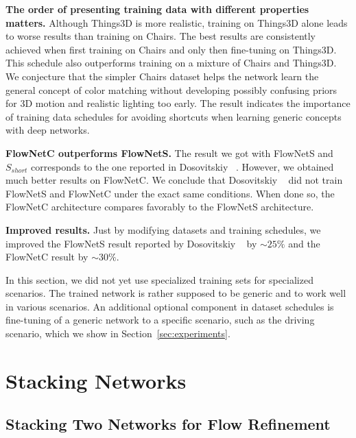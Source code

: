 \documentclass[10pt,twocolumn,letterpaper]{article}%
\newcommand{\chairs}{\mbox{Chairs}\xspace}
\newcommand{\things}{\mbox{Things3D}\xspace}
\newcommand{\FN}[1]{\mbox{FlowNet2-#1}\xspace}
\newcommand{\Sshort}{S_\mathit{short}}
\begin{document}
\textbf{The order of presenting training data with different properties matters.} Although \things is more realistic, training on \things alone leads to worse results than training on \chairs. The best results are consistently achieved when first training on \chairs and only then fine-tuning on \things. This schedule also outperforms training on a mixture of \chairs and \things. 
We conjecture that the simpler \chairs dataset helps the network learn the general concept of color matching without developing possibly confusing priors for 3D motion and realistic lighting too early. 
The result indicates the importance of training data schedules for avoiding shortcuts when learning generic concepts with deep networks. 

\textbf{FlowNetC outperforms FlowNetS.} The result we got with FlowNetS and $\Sshort$ corresponds to the one reported in Dosovitskiy \etal~\cite{DFIB15}. However, we obtained much better results on FlowNetC. We conclude that Dosovitskiy \etal~\cite{DFIB15} did not train FlowNetS and FlowNetC under the exact same conditions. When done so, the FlowNetC architecture compares favorably to the FlowNetS architecture. 

\textbf{Improved results. }Just by modifying datasets and training schedules, we improved the FlowNetS result reported by Dosovitskiy \etal~\cite{DFIB15} by $\sim 25\%$ and the FlowNetC result by $\sim 30\%$. 

In this section, we did not yet use specialized training sets for specialized scenarios. The trained network is rather supposed to be generic and to work well in various scenarios. An additional optional component in dataset schedules is fine-tuning of a generic network to a specific scenario, such as the driving scenario, which we show in Section~\ref{sec:experiments}.

\section{Stacking Networks} 
\label{sec:network-schedules}

\subsection{Stacking Two Networks for Flow Refinement\label{sec:two_stack}}
\end{document}
